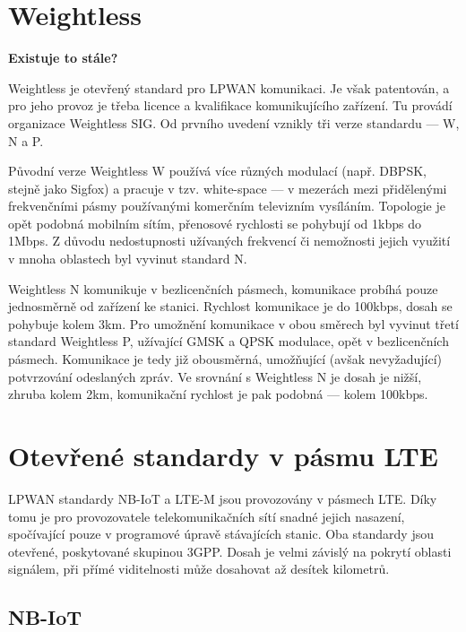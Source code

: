
\section{Weightless}

\textbf{Existuje to stále?}

Weightless je otevřený standard pro LPWAN komunikaci. Je však patentován, a pro 
jeho provoz je třeba licence a kvalifikace komunikujícího zařízení. Tu provádí 
organizace Weightless SIG. Od prvního uvedení vznikly tři verze standardu --- 
W, N a P.

Původní verze Weightless W používá více různých modulací (např. DBPSK, stejně 
jako Sigfox) a pracuje v tzv. white-space --- v mezerách mezi přidělenými 
frekvenčními pásmy používanými komerčním televizním vysíláním. Topologie je opět 
podobná 
mobilním sítím, přenosové rychlosti se pohybují od 1kbps do 1Mbps. Z důvodu 
nedostupnosti užívaných frekvencí či nemožnosti jejich využití v mnoha oblastech 
byl vyvinut standard N.

Weightless N komunikuje v bezlicenčních pásmech, komunikace probíhá pouze 
jednosměrně od zařízení ke stanici. Rychlost komunikace je do 100kbps, dosah se 
pohybuje kolem 3km. Pro umožnění komunikace v obou směrech byl vyvinut třetí 
standard Weightless P, užívající GMSK a QPSK modulace, opět v bezlicenčních 
pásmech. Komunikace je tedy již obousměrná, umožňující (avšak nevyžadující) 
potvrzování odeslaných zpráv. Ve srovnání s Weightless N je dosah je nižší, 
zhruba kolem 2km, komunikační rychlost je pak podobná --- kolem 100kbps.


\section{Otevřené standardy v pásmu LTE}

LPWAN standardy NB-IoT a LTE-M jsou provozovány v pásmech LTE. Díky tomu je pro 
provozovatele telekomunikačních sítí snadné jejich nasazení, spočívající pouze 
v programové úpravě stávajících stanic. Oba standardy jsou otevřené, poskytované
skupinou 3GPP. Dosah je velmi závislý na pokrytí oblasti signálem, při přímé
viditelnosti může dosahovat až desítek kilometrů.

\subsection{NB-IoT}

